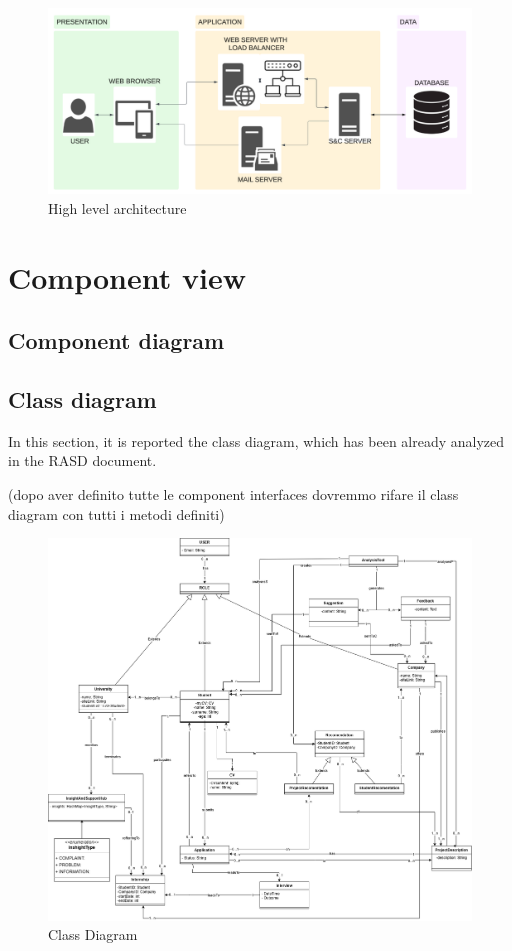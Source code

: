 \begin{figure}[H]
    \centering
    \includegraphics[width=0.8\linewidth]{DD//Images/3tier.png}
    \caption{High level architecture }
\end{figure}

\section{Component view} 

\subsection{Component diagram}

\subsection{Class diagram}
In this section, it is reported the class diagram, which has been already analyzed in the RASD document. 

(dopo aver definito tutte le component interfaces dovremmo rifare il class diagram con tutti i metodi definiti)

\begin{figure}[H]
    \centering
    \includegraphics[width=1\linewidth]{RASD//Images/UML.drawio.png}
    \caption{Class Diagram }
\end{figure}


